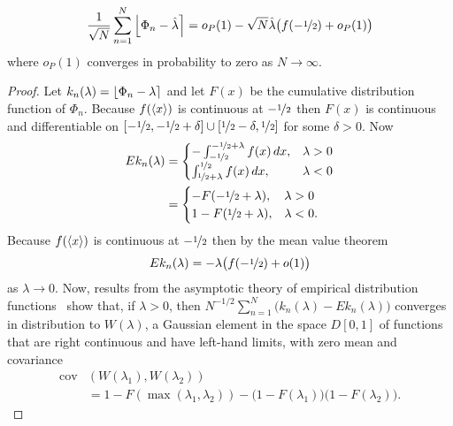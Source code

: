 \documentclass[journal]{../bib/IEEEtran}
\begin{document}
\begin{lemma}\label{lem:EI_n}
\[
\frac{1}{\sqrt{N}}\sum_{n=1}^{N} {\left\lfloor  \Phi_n - \hat{\lambda} \right\rceil} = o_P(1) - \sqrt{N}\hat{\lambda}\big( f(-\nicefrac{1}{2}) + o_P(1) \big)
\]
where $o_P(1)$ converges in probability to zero as $N\rightarrow\infty$.
\end{lemma}
\begin{proof}
Let $k_n(\lambda) = {\left\lfloor \Phi_n - \lambda \right\rceil}$ and let $F(x)$ be the cumulative distribution function of $\Phi_n$.  Because $f(\left< x \right>)$ is continuous at $-\nicefrac{1}{2}$ then $F(x)$ is continuous and differentiable on $[-\nicefrac{1}{2}, -\nicefrac{1}{2} + \delta] \cup [\nicefrac{1}{2} - \delta, \nicefrac{1}{2}]$ for some $\delta > 0$.  Now
\begin{align*}
E k_n(\lambda) &= \begin{cases}
-\int_{-\nicefrac{1}{2}}^{-\nicefrac{1}{2} + \lambda}f(x)\,dx, &  \lambda > 0 \\
\int_{\nicefrac{1}{2} + \lambda}^{\nicefrac{1}{2}}f(x)\,dx, &  \lambda < 0
\end{cases} \\
&= \begin{cases}
-F(-\nicefrac{1}{2} + \lambda), &  \lambda > 0 \\
1 - F(\nicefrac{1}{2} + \lambda), &  \lambda < 0.
\end{cases} 
\end{align*}
Because $f(\left< x \right>)$ is continuous at $-\nicefrac{1}{2}$ then by the mean value theorem
\[
E k_n(\lambda) = -\lambda \big( f(-\nicefrac{1}{2}) + o(1) \big)
\] 
as $\lambda \rightarrow 0$.  Now, results from the asymptotic theory of empirical distribution functions~\cite[Theorem 14.3, p. 149]{Billingsley1999_convergence_of_probability_measures} show that, if $\lambda > 0$, then $N^{-1/2} \sum_{n=1}^{N} \big( k_n(\lambda) - Ek_n(\lambda) \big)$ converges in distribution to $W(\lambda)$, a Gaussian element in the space $D[0,1]$ of functions that are right continuous and have left-hand limits, with zero mean and covariance
\begin{align*}
\operatorname{cov}&( W(\lambda_1), W(\lambda_2) ) \\
&= 1 - F( \max(\lambda_1, \lambda_2) ) - \big( 1 - F(\lambda_1)  \big) \big( 1 - F(\lambda_2)  \big).
\end{align*}


\end{proof}
\end{document}
